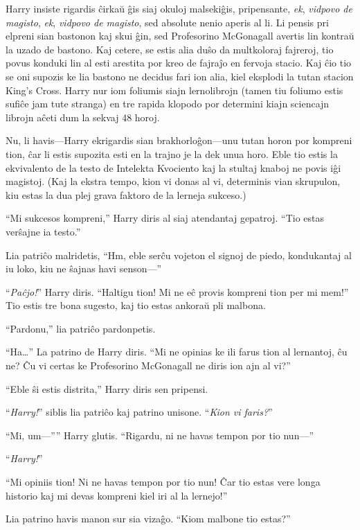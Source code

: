 Harry insiste rigardis ĉirkaŭ ĝis siaj okuloj malsekiĝis, pripensante,
\emph{ek}, \emph{vidpovo de magisto}, \emph{ek}, \emph{vidpovo de
  magisto}, sed absolute nenio aperis al li. Li pensis pri elpreni
sian bastonon kaj skui ĝin, sed Profesorino McGonagall avertis lin
kontraŭ la uzado de bastono. Kaj cetere, se estis alia duŝo da
multkoloraj fajreroj, tio povus konduki lin al esti arestita por kreo
de fajraĵo en fervoja stacio. Kaj ĉio tio se oni supozis ke lia
bastono ne decidus fari ion alia, kiel eksplodi la tutan stacion
King's Cross.  Harry nur iom foliumis siajn lernolibrojn (tamen tiu
foliumo estis sufiĉe jam tute stranga) en tre rapida klopodo por
determini kiajn sciencajn librojn aĉeti dum la sekvaj 48 horoj.

Nu, li havis—Harry ekrigardis sian brakhorloĝon—unu tutan horon por
kompreni tion, ĉar li estis supozita esti en la trajno je la dek unua
horo. Eble tio estis la ekvivalento de la testo de Intelekta Kvociento
kaj la stultaj knaboj ne povis iĝi magistoj. (Kaj la ekstra tempo,
kion vi donas al vi, determinis vian skrupulon, kiu estas la dua plej
grava faktoro de la lerneja sukceso.)

``Mi sukcesos kompreni,'' Harry diris al siaj atendantaj
gepatroj. ``Tio estas verŝajne ia testo.''

Lia patriĉo malridetis, ``Hm, eble serĉu vojeton el signoj de piedo,
kondukantaj al iu loko, kiu ne ŝajnas havi senson—''

``\emph{Paĉjo!}'' Harry diris. ``Haltigu tion! Mi ne eĉ provis
kompreni tion per mi mem!'' Tio estis tre bona sugesto, kaj tio estas
ankoraŭ pli malbona.

``Pardonu,'' lia patriĉo pardonpetis.

``Ha\ldots'' La patrino de Harry diris. ``Mi ne opinias ke ili farus
tion al lernantoj, ĉu ne? Ĉu vi certas ke Profesorino McGonagall ne diris
ion ajn al vi?''

``Eble ŝi estis distrita,'' Harry diris sen pripensi.

``\emph{Harry!}'' siblis lia patriĉo kaj patrino unisone. ``\emph{Kion
  vi faris?}''

``Mi, um—”'' Harry glutis. ``Rigardu, ni ne havas tempon por tio nun—''

``\emph{Harry!}''

``Mi opiniis tion! Ni ne havas tempon por tio nun! Ĉar tio estas vere
longa historio kaj mi devas kompreni kiel iri al la lernejo!''

Lia patrino havis manon sur sia vizaĝo. ``Kiom malbone tio estas?''

